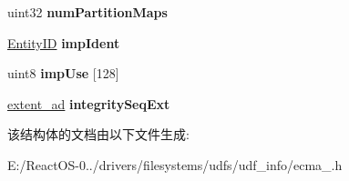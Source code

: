\begin{DoxyCompactItemize}
uint32 {\bfseries num\+Partition\+Maps}
\item 
\mbox{\label{struct_logical_vol_desc_a562cfd8dd308a4897d7e99c06ce5c4da}} 
\hyperlink{struct_entity_i_d}{Entity\+ID} {\bfseries imp\+Ident}
\item 
\mbox{\label{struct_logical_vol_desc_a2ec5b58a6e624ed34ebca449c55d722a}} 
uint8 {\bfseries imp\+Use} \mbox{[}128\mbox{]}
\item 
\mbox{\label{struct_logical_vol_desc_a3dc135352130256a5e82ea2992d24bd6}} 
\hyperlink{struct___e_x_t_e_n_t___a_d}{extent\+\_\+ad} {\bfseries integrity\+Seq\+Ext}
\end{DoxyCompactItemize}


该结构体的文档由以下文件生成\+:\begin{DoxyCompactItemize}
\item 
E\+:/\+React\+O\+S-\/0../drivers/filesystems/udfs/udf\+\_\+info/ecma\+\_.\+h\end{DoxyCompactItemize}
